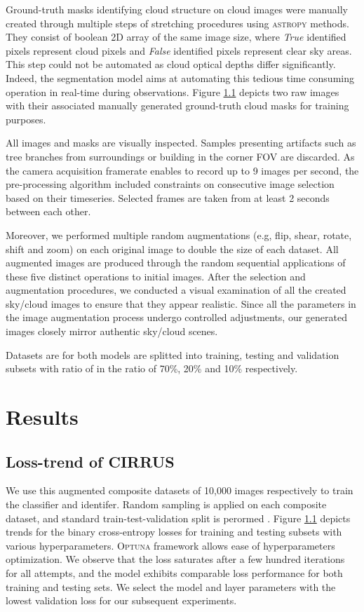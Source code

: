 \documentclass{article}
\begin{document}
Ground-truth masks identifying cloud structure on cloud images were manually created through multiple steps of stretching procedures using \textsc{astropy} methods. They consist of boolean 2D array of the same image size, where \textit{True} identified pixels represent cloud pixels and \textit{False} identified pixels represent clear sky areas. This step could not be automated as cloud optical depths differ significantly. Indeed, the segmentation model aims at automating this tedious time consuming operation in real-time during observations. Figure \ref{} depicts two raw images with their associated manually generated ground-truth cloud masks for training purposes.

All images and masks are visually inspected. Samples presenting artifacts such as tree branches from surroundings or building in the corner FOV are discarded. As the camera acquisition framerate enables to record up to 9 images per second, the pre-processing algorithm included constraints on consecutive image selection based on their timeseries. Selected frames are taken from at least 2 seconds between each other.

Moreover, we performed multiple random augmentations (e.g, flip, shear, rotate, shift and zoom) on each original image to double the size of each dataset. All augmented images are produced through the random sequential applications of these five distinct operations to initial images. After the selection and augmentation procedures, we conducted a visual examination of all the created sky/cloud images to ensure that they appear realistic. Since all the parameters in the image augmentation process undergo controlled adjustments, our generated images closely mirror authentic sky/cloud scenes.

Datasets are for both models are splitted into training, testing and validation subsets with ratio of in the ratio of 70\%, 20\% and 10\% respectively.

\section{Results}

\subsection{Loss-trend of CIRRUS}

We use this augmented composite datasets of 10,000 images respectively to train the classifier and identifer. Random sampling is applied on each composite dataset, and standard train-test-validation split is perormed . Figure \ref{} depicts trends for the binary cross-entropy losses for training and testing subsets with various hyperparameters. \textsc{Optuna} framework allows ease of hyperparameters optimization. We observe that the loss saturates after a few hundred iterations for all attempts, and the model exhibits comparable loss performance for both training and testing sets. We select the model and layer parameters with the lowest validation loss for our subsequent experiments.
\end{document}
